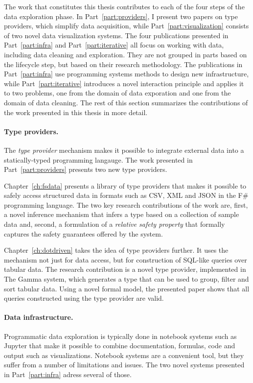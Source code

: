 \documentclass[fleqn,11pt]{report}
\theoremstyle{definition}
\begin{document}
The work that constitutes this thesis contributes to each of the four steps of the data
exploration phase. In Part~\ref{part:providers}, I present two papers on type providers,
which simplify data acquisition, while Part~\ref{part:visualization} consists of two
novel data visualization systems. The four publications presented in Part~\ref{part:infra}
and Part~\ref{part:iterative} all focus on working with data, including data cleaning and
exploration. They are not grouped in parts based on the lifecycle step, but based on their research
methodology. The publications in Part~\ref{part:infra} use programming systems methods to
design new infrastructure, while Part~\ref{part:iterative} introduces a novel interaction
principle and applies it to two problems, one from the domain of data exporation and one from the
domain of data cleaning. The rest of this section summarizes the contributions of the work
presented in this thesis in more detail.

\paragraph{Type providers.}
The \emph{type provider} mechanism \citep{syme-2012-providers,syme-2013-inforich} makes it possible
to integrate external data into a statically-typed programming langauge. The work presented in
Part~\ref{part:providers} presents two new type providers.

Chapter~\ref{ch:fsdata} presents a library of type providers that makes it possible to safely access
structured data in formats such as CSV, XML and JSON in the F\# programming language. The two key
research contributions of the work are, first, a novel inference mechanism that infers a type based
on a collection of sample data and, second, a formulation of a \emph{relative safety property} that
formally captures the safety guarantees offered by the system.

Chapter~\ref{ch:dotdriven} takes the idea of type providers further. It uses the mechanism not just
for data access, but for construction of SQL-like queries over tabular data. The research
contribution is a novel type provider, implemented in The Gamma system, which generates a type that
can be used to group, filter and sort tabular data. Using a novel formal model, the presented paper
shows that all queries constructed using the type provider are valid.

\paragraph{Data infrastructure.}
Programmatic data exploration is typically done in notebook systems such as Jupyter
\citep{kluyver-2016-jupyter} that make it possible to combine documentation, formulas, code and
output such as visualizations. Notebook systems are a convenient tool, but they suffer from
a number of limitations and issues. The two novel systems presented in Part~\ref{part:infra} adress
several of those.
\end{document}
